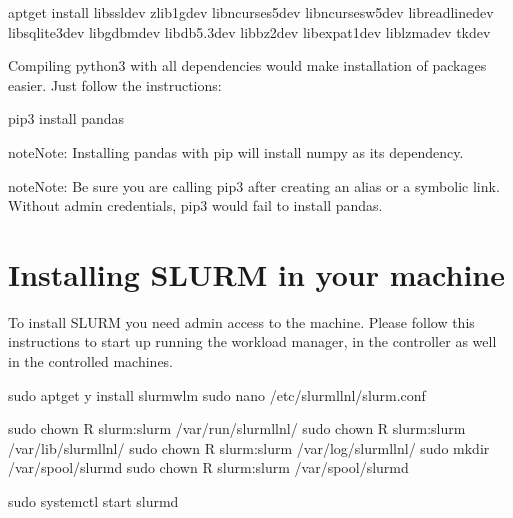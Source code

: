 \documentclass[letterpaper,10pt,english]{sphinxmanual}
\begin{document}
%
\begin{sphinxVerbatim}[commandchars=\\\{\}]
apt\PYGZhy{}get install libssl\PYGZhy{}dev zlib1g\PYGZhy{}dev libncurses5\PYGZhy{}dev 
libncursesw5\PYGZhy{}dev libreadline\PYGZhy{}dev libsqlite3\PYGZhy{}dev libgdbm\PYGZhy{}dev 
libdb5.3\PYGZhy{}dev libbz2\PYGZhy{}dev libexpat1\PYGZhy{}dev liblzma\PYGZhy{}dev tk\PYGZhy{}dev
\end{sphinxVerbatim}

Compiling python3 with all dependencies would make installation of packages
easier. Just follow the instructions:

%
\begin{sphinxVerbatim}[commandchars=\\\{\}]
pip3 install pandas
\end{sphinxVerbatim}

\begin{sphinxadmonition}{note}{Note:}
Installing pandas with pip will install numpy as its dependency.
\end{sphinxadmonition}

\begin{sphinxadmonition}{note}{Note:}
Be sure you are calling pip3 after creating an alias or a symbolic link.
Without admin credentials, pip3 would fail to install pandas.
\end{sphinxadmonition}


\chapter{Installing SLURM in your machine}
\label{\detokenize{SLURM:installing-slurm-in-your-machine}}\label{\detokenize{SLURM:slurm-instructions}}\label{\detokenize{SLURM::doc}}
To install SLURM you need admin access to the machine. Please follow this
instructions to start up running the workload manager, in the controller as well
in the controlled machines.

%
\begin{sphinxVerbatim}[commandchars=\\\{\}]
sudo apt\PYGZhy{}get \PYGZhy{}y install slurm\PYGZhy{}wlm
sudo nano /etc/slurm\PYGZhy{}llnl/slurm.conf

sudo chown \PYGZhy{}R slurm:slurm /var/run/slurm\PYGZhy{}llnl/
sudo chown \PYGZhy{}R slurm:slurm /var/lib/slurm\PYGZhy{}llnl/
sudo chown \PYGZhy{}R slurm:slurm /var/log/slurm\PYGZhy{}llnl/
sudo mkdir /var/spool/slurmd
sudo chown \PYGZhy{}R slurm:slurm /var/spool/slurmd

sudo systemctl start slurmd
\end{sphinxVerbatim}
\end{document}
